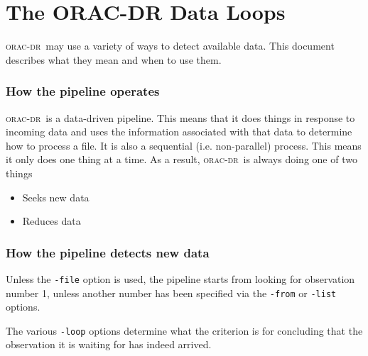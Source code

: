 \documentclass[twoside,11pt]{article}
\renewcommand{\_}{\texttt{\symbol{95}}}
\newcommand{\oracdr}{\textsc{orac-dr}}
\begin{document}
\section{The ORAC-DR Data Loops\label{The_ORAC-DR_Data_Loops}}


\oracdr\ may use a variety of ways to detect available data. This
document describes what they mean and when to use them.

\subsubsection*{How the pipeline operates\label{The_ORAC-DR_Data_Loops_How_the_pipeline_operates}}

\oracdr\ is a data-driven pipeline. This means that it does things in
response to incoming data and uses the information associated with
that data to determine how to process a file. It is also a sequential
(i.e. non-parallel) process. This means it only does one thing at a
time. As a result, \oracdr\ is always doing one of two things

\begin{itemize}
\item 

Seeks new data

\item 

Reduces data

\end{itemize}
\subsubsection*{How the pipeline detects new data\label{The_ORAC-DR_Data_Loops_How_the_pipeline_detects_new_data}}

Unless the \texttt{-file} option is used, the pipeline starts from looking for observation number 1, unless another number has been specified via the 
\texttt{-from} or \texttt{-list} options.



The various \texttt{-loop} options determine what the criterion is for
concluding that the observation it is waiting for has indeed arrived.
\end{document}

